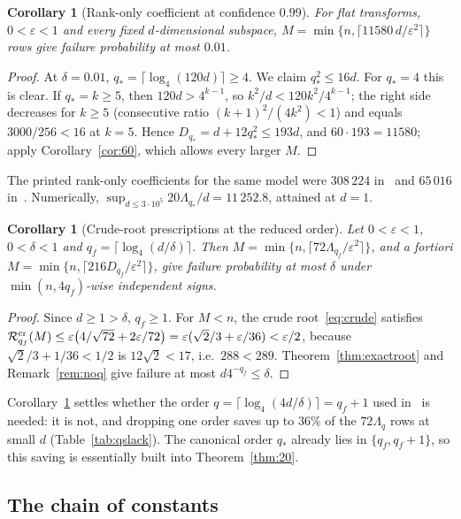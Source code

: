 \documentclass[11pt,a4paper]{article}
\newtheorem{corollary}[theorem]{Corollary}
\theoremstyle{definition}
\theoremstyle{remark}
\numberwithin{equation}{section}
\newcommand{\eps}{\varepsilon}
\newcommand{\Rex}{\mathcal R}
\begin{document}
\begin{corollary}[Rank-only coefficient at confidence $0.99$]\label{cor:rankonly}
For flat transforms, $0<\eps<1$ and every fixed $d$-dimensional subspace,
$M=\min\{n,\lceil11580\,d/\eps^2\rceil\}$ rows give failure probability at
most $0.01$.
\end{corollary}
\begin{proof}
At $\delta=0.01$, $q_*=\lceil\log_4(120d)\rceil\ge4$. We claim $q_*^2\le16d$.
For $q_*=4$ this is clear. If $q_*=k\ge5$, then $120d>4^{k-1}$, so
$k^2/d<120k^2/4^{k-1}$; the right side decreases for $k\ge5$ (consecutive
ratio $(k+1)^2/(4k^2)<1$) and equals $3000/256<16$ at $k=5$. Hence
$D_{q_*}=d+12q_*^2\le193d$, and $60\cdot193=11580$; apply
Corollary~\ref{cor:60}, which allows every larger $M$.
\end{proof}
The printed rank-only coefficients for the same model were $308\,224$
in~\cite{V11} and $65\,016$ in~\cite{HY}. Numerically,
$\sup_{d\le3\cdot10^5}20\Lambda_{q_*}/d=11\,252.8$, attained at $d=1$.

\begin{corollary}[Crude-root prescriptions at the reduced order]\label{cor:qf}
Let $0<\eps<1$, $0<\delta<1$ and $q_f=\lceil\log_4(d/\delta)\rceil$. Then
$M=\min\{n,\lceil72\Lambda_{q_f}/\eps^2\rceil\}$, and a fortiori
$M=\min\{n,\lceil216D_{q_f}/\eps^2\rceil\}$, give failure probability at most
$\delta$ under $\min(n,4q_f)$-wise independent signs.
\end{corollary}
\begin{proof}
Since $d\ge1>\delta$, $q_f\ge1$. For $M<n$, the crude root~\eqref{eq:crude}
satisfies
$\Rex^{\rm cr}_{q_f}(M)\le\eps\bigl(4/\sqrt{72}+2\eps/72\bigr)
=\eps(\sqrt2/3+\eps/36)<\eps/2$, because $\sqrt2/3+1/36<1/2$ is
$12\sqrt2<17$, i.e.\ $288<289$. Theorem~\ref{thm:exactroot} and
Remark~\ref{rem:noq} give failure at most $d4^{-q_f}\le\delta$.
\end{proof}
Corollary~\ref{cor:qf} settles whether the order
$q=\lceil\log_4(4d/\delta)\rceil=q_f+1$ used in~\cite{V11,HY} is needed: it is
not, and dropping one order saves up to $36\%$ of the $72\Lambda_q$ rows at
small $d$ (Table~\ref{tab:qslack}). The canonical order $q_*$ already lies in
$\{q_f,q_f+1\}$, so this saving is essentially built into
Theorem~\ref{thm:20}.

\subsection{The chain of constants}\label{sec:chain}
\end{document}
